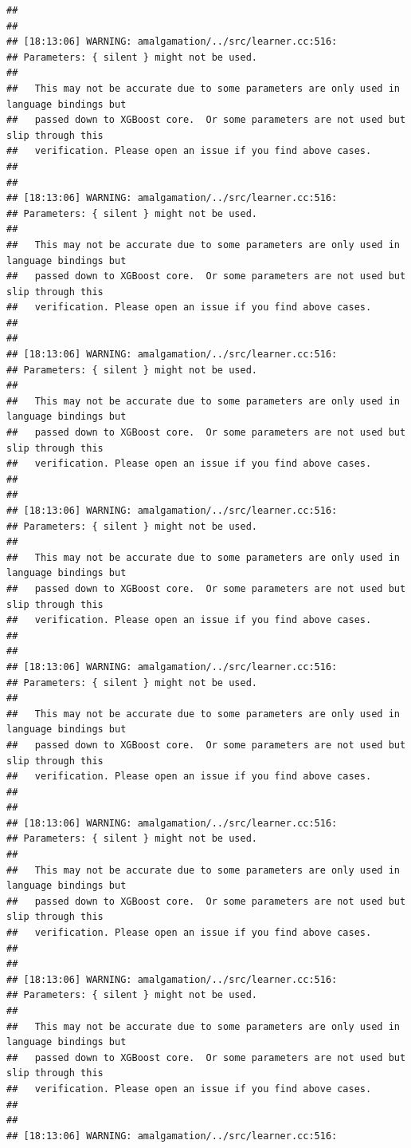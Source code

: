 \documentclass[AMS,STIX2COL]{WileyNJD-v2}\usepackage[]{graphicx}\usepackage[]{color}
\makeatletter
\newenvironment{kframe}{%
 \def\at@end@of@kframe{}%
 \ifinner\ifhmode%
  \def\at@end@of@kframe{\end{minipage}}%
  \begin{minipage}{\columnwidth}%
 \fi\fi%
 \def\FrameCommand##1{\hskip\@totalleftmargin \hskip-\fboxsep
 \colorbox{shadecolor}{##1}\hskip-\fboxsep
     \hskip-\linewidth \hskip-\@totalleftmargin \hskip\columnwidth}%
 \MakeFramed {\advance\hsize-\width
   \@totalleftmargin\z@ \linewidth\hsize
   \@setminipage}}%
 {\par\unskip\endMakeFramed%
 \at@end@of@kframe}
\newenvironment{knitrout}{}{} %
\makeatother
\begin{document}
\begin{knitrout}
\begin{kframe}
\begin{verbatim}
## 
## 
## [18:13:06] WARNING: amalgamation/../src/learner.cc:516: 
## Parameters: { silent } might not be used.
## 
##   This may not be accurate due to some parameters are only used in language bindings but
##   passed down to XGBoost core.  Or some parameters are not used but slip through this
##   verification. Please open an issue if you find above cases.
## 
## 
## [18:13:06] WARNING: amalgamation/../src/learner.cc:516: 
## Parameters: { silent } might not be used.
## 
##   This may not be accurate due to some parameters are only used in language bindings but
##   passed down to XGBoost core.  Or some parameters are not used but slip through this
##   verification. Please open an issue if you find above cases.
## 
## 
## [18:13:06] WARNING: amalgamation/../src/learner.cc:516: 
## Parameters: { silent } might not be used.
## 
##   This may not be accurate due to some parameters are only used in language bindings but
##   passed down to XGBoost core.  Or some parameters are not used but slip through this
##   verification. Please open an issue if you find above cases.
## 
## 
## [18:13:06] WARNING: amalgamation/../src/learner.cc:516: 
## Parameters: { silent } might not be used.
## 
##   This may not be accurate due to some parameters are only used in language bindings but
##   passed down to XGBoost core.  Or some parameters are not used but slip through this
##   verification. Please open an issue if you find above cases.
## 
## 
## [18:13:06] WARNING: amalgamation/../src/learner.cc:516: 
## Parameters: { silent } might not be used.
## 
##   This may not be accurate due to some parameters are only used in language bindings but
##   passed down to XGBoost core.  Or some parameters are not used but slip through this
##   verification. Please open an issue if you find above cases.
## 
## 
## [18:13:06] WARNING: amalgamation/../src/learner.cc:516: 
## Parameters: { silent } might not be used.
## 
##   This may not be accurate due to some parameters are only used in language bindings but
##   passed down to XGBoost core.  Or some parameters are not used but slip through this
##   verification. Please open an issue if you find above cases.
## 
## 
## [18:13:06] WARNING: amalgamation/../src/learner.cc:516: 
## Parameters: { silent } might not be used.
## 
##   This may not be accurate due to some parameters are only used in language bindings but
##   passed down to XGBoost core.  Or some parameters are not used but slip through this
##   verification. Please open an issue if you find above cases.
## 
## 
## [18:13:06] WARNING: amalgamation/../src/learner.cc:516: 

\end{verbatim}
\end{kframe}
\end{knitrout}
\end{document}
